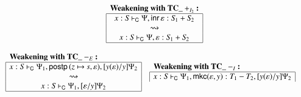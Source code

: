 \documentclass{lmcs}
\newcommand{\DualLNLLogicnt}[1]{\mathit{#1}}
\newcommand{\DualLNLLogicmv}[1]{\mathit{#1}}
\newcommand{\DualLNLLogicsym}[1]{#1}
\newcommand{\DualLNLLogicdrulename}[1]{\textsc{#1}}
\newcommand{\DualLNLLogicdruleTCXXdITwoName}[0]{\DualLNLLogicdrulename{TC\_dI2}}
\newcommand{\DualLNLLogicdruleTCXXsubIName}[0]{\DualLNLLogicdrulename{TC\_subI}}
\newcommand{\DualLNLLogicdruleTCXXsubEName}[0]{\DualLNLLogicdrulename{TC\_subE}}
\renewcommand{\DualLNLLogicdrulename}[1]{#1}
\renewcommand{\DualLNLLogicdruleTCXXdITwoName}{\text{TC\_}+_{I_2}}
\renewcommand{\DualLNLLogicdruleTCXXsubIName}{\text{TC\_}-_I}
\renewcommand{\DualLNLLogicdruleTCXXsubEName}{\text{TC\_}-_E}
\begin{document}
\begin{figure}
\begin{mdframed}
\begin{center}
\begin{math}
\begin{array}{c}
\begin{array}{cc}
\begin{array}{|c|}
          \hline
        \end{array}
        &
        \begin{array}{|c|}
          \multicolumn{1}{l}{\textbf{\textbf{Weakening with $\DualLNLLogicdruleTCXXdITwoName{}$}:}}\\
          \hline
            \DualLNLLogicmv{x}  :  \DualLNLLogicnt{S}  \vdash_{\mathsf{C} }  \Psi  \DualLNLLogicsym{,}   \mathsf{inr}\,  \varepsilon    \DualLNLLogicsym{:}   \DualLNLLogicnt{S_{{\mathrm{1}}}}  +  \DualLNLLogicnt{S_{{\mathrm{2}}}}  \\
           \rightsquigarrow\\
            \DualLNLLogicmv{x}  :  \DualLNLLogicnt{S}  \vdash_{\mathsf{C} }  \Psi  \DualLNLLogicsym{,}   \varepsilon   \DualLNLLogicsym{:}   \DualLNLLogicnt{S_{{\mathrm{1}}}}  +  \DualLNLLogicnt{S_{{\mathrm{2}}}}  \\               
          \hline
        \end{array}
        \end{array}\\
        \\
        \begin{array}{cc}
          \begin{array}{|c|}
          \multicolumn{1}{l}{\textbf{\textbf{Weakening with $\DualLNLLogicdruleTCXXsubEName{}$}:}}\\
          \hline
            \DualLNLLogicmv{x}  :  \DualLNLLogicnt{S}  \vdash_{\mathsf{C} }  \Psi_{{\mathrm{1}}}  \DualLNLLogicsym{,}    \mathsf{postp}\,( \DualLNLLogicmv{z}  \mapsto  \DualLNLLogicnt{s} ,   \varepsilon  )    \DualLNLLogicsym{,}  \DualLNLLogicsym{[}  \DualLNLLogicmv{y}  \DualLNLLogicsym{(}   \varepsilon   \DualLNLLogicsym{)}  \DualLNLLogicsym{/}  \DualLNLLogicmv{y}  \DualLNLLogicsym{]}  \Psi_{{\mathrm{2}}} \\
           \rightsquigarrow\\
            \DualLNLLogicmv{x}  :  \DualLNLLogicnt{S}  \vdash_{\mathsf{C} }  \Psi_{{\mathrm{1}}}  \DualLNLLogicsym{,}  \DualLNLLogicsym{[}   \varepsilon   \DualLNLLogicsym{/}  \DualLNLLogicmv{y}  \DualLNLLogicsym{]}  \Psi_{{\mathrm{2}}} \\               
          \hline
        \end{array}
        &
        \begin{array}{|c|}
          \multicolumn{1}{l}{\textbf{\textbf{Weakening with $\DualLNLLogicdruleTCXXsubIName{}$}:}}\\
          \hline
            \DualLNLLogicmv{x}  :  \DualLNLLogicnt{S}  \vdash_{\mathsf{C} }  \Psi_{{\mathrm{1}}}  \DualLNLLogicsym{,}   \mathsf{mkc}(  \varepsilon  , \DualLNLLogicmv{y} )   \DualLNLLogicsym{:}   \DualLNLLogicnt{T_{{\mathrm{1}}}}  -  \DualLNLLogicnt{T_{{\mathrm{2}}}}   \DualLNLLogicsym{,}  \DualLNLLogicsym{[}  \DualLNLLogicmv{y}  \DualLNLLogicsym{(}   \varepsilon   \DualLNLLogicsym{)}  \DualLNLLogicsym{/}  \DualLNLLogicmv{y}  \DualLNLLogicsym{]}  \Psi_{{\mathrm{2}}} \\

\end{array}
\end{array}
\end{array}
\end{math}
\end{center}
\end{mdframed}
\end{figure}
\end{document}
